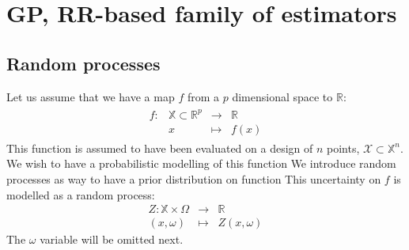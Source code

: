 \documentclass[a4paper,11pt]{article}
\begin{document}
\section{GP, RR-based family of estimators}
\subsection{Random processes}
Let us assume that we have a map $f$ from a $p$ dimensional space to $\mathbb{R}$:
\begin{align}
  \begin{array}{rrcl}
    f: & \mathbb{X} \subset \mathbb{R}^p& \longrightarrow & \mathbb{R} \\
       & x & \longmapsto & f(x)
  \end{array}
\end{align}
This function is assumed to have been evaluated on a design of $n$ points, $\mathcal{X} \subset \mathbb{X}^n$. 
We wish to have a probabilistic modelling of this function
We introduce random processes as way to have a prior distribution on function
This uncertainty on $f$ is modelled as a random process:
\begin{equation}
  \begin{array}{rcl}
    Z: \mathbb{X} \times \Omega& \longrightarrow & \mathbb{R} \\
    (x,\omega) & \longmapsto & Z(x,\omega)
  \end{array}
\end{equation}
The $\omega$ variable will be omitted next.
\end{document}

